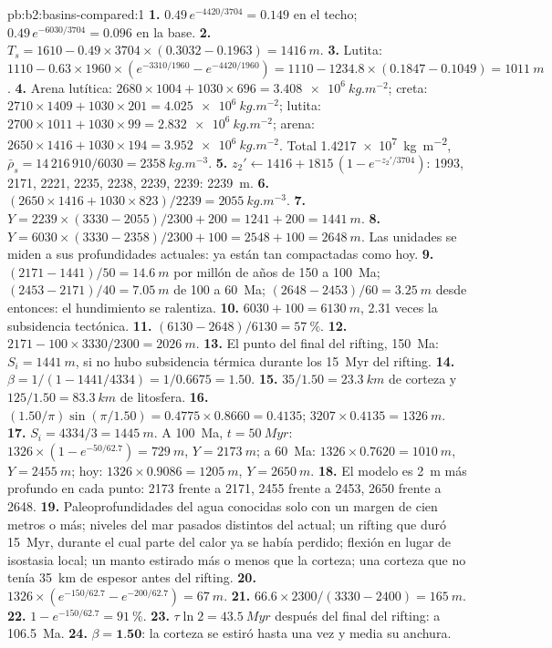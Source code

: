 \begin{solution}{pb:b2:basins-compared:1}
\textbf{1.} $0.49\,e^{-4420/3704} = 0.149$ en el techo; $0.49\,e^{-6030/3704} = 0.096$ en la base.
\textbf{2.} $T_s = 1610 - 0.49\times3704\times(0.3032 - 0.1963) = \qty{1416}{m}$.
\textbf{3.} Lutita: $1110 - 0.63\times1960\times(e^{-3310/1960} - e^{-4420/1960}) = 1110 - 1234.8
\times(0.1847 - 0.1049) = \qty{1011}{m}$.
\textbf{4.} Arena lutítica: $2680\times1004 + 1030\times696 = \qty{3.408e6}{kg.m^{-2}}$; creta:
$2710\times1409 + 1030\times201 = \qty{4.025e6}{kg.m^{-2}}$; lutita: $2700\times1011 + 1030\times99 =
\qty{2.832e6}{kg.m^{-2}}$; arena: $2650\times1416 + 1030\times194 = \qty{3.952e6}{kg.m^{-2}}$. Total
\qty{1.4217e7}{kg.m^{-2}}, $\bar\rho_s = 14\,216\,910/6030 = \qty{2358}{kg.m^{-3}}$.
\textbf{5.} $z_2' \leftarrow 1416 + 1815\,(1 - e^{-z_2'/3704})$: 1993, 2171, 2221, 2235, 2238, 2239,
2239: \qty{2239}{m}.
\textbf{6.} $(2650\times1416 + 1030\times823)/2239 = \qty{2055}{kg.m^{-3}}$.
\textbf{7.} $Y = 2239\times(3330 - 2055)/2300 + 200 = 1241 + 200 = \qty{1441}{m}$.
\textbf{8.} $Y = 6030\times(3330 - 2358)/2300 + 100 = 2548 + 100 = \qty{2648}{m}$. Las unidades se
miden a sus profundidades actuales: ya están tan compactadas como hoy.
\textbf{9.} $(2171 - 1441)/50 = \qty{14.6}{m}$ por millón de años de 150 a \qty{100}{Ma};
$(2453 - 2171)/40 = \qty{7.05}{m}$ de 100 a \qty{60}{Ma}; $(2648 - 2453)/60 = \qty{3.25}{m}$
desde entonces: el hundimiento se ralentiza.
\textbf{10.} $6030 + 100 = \qty{6130}{m}$, 2.31 veces la subsidencia tectónica.
\textbf{11.} $(6130 - 2648)/6130 = \qty{57}{\percent}$.
\textbf{12.} $2171 - 100\times3330/2300 = \qty{2026}{m}$.
\textbf{13.} El punto del final del rifting, \qty{150}{Ma}: $S_i = \qty{1441}{m}$, si no hubo subsidencia
térmica durante los \qty{15}{Myr} del rifting.
\textbf{14.} $\beta = 1/(1 - 1441/4334) = 1/0.6675 = 1.50$.
\textbf{15.} $35/1.50 = \qty{23.3}{km}$ de corteza y $125/1.50 = \qty{83.3}{km}$ de litosfera.
\textbf{16.} $(1.50/\pi)\sin(\pi/1.50) = 0.4775\times0.8660 = 0.4135$; $3207\times0.4135 =
\qty{1326}{m}$.
\textbf{17.} $S_i = 4334/3 = \qty{1445}{m}$. A \qty{100}{Ma}, $t = \qty{50}{Myr}$: $1326\times(1 -
e^{-50/62.7}) = \qty{729}{m}$, $Y = \qty{2173}{m}$; a \qty{60}{Ma}: $1326\times0.7620 =
\qty{1010}{m}$, $Y = \qty{2455}{m}$; hoy: $1326\times0.9086 = \qty{1205}{m}$, $Y = \qty{2650}{m}$.
\textbf{18.} El modelo es \qty{2}{m} más profundo en cada punto: 2173 frente a 2171, 2455 frente a 2453,
2650 frente a 2648.
\textbf{19.} Paleoprofundidades del agua conocidas solo con un margen de cien metros o más; niveles del mar pasados
distintos del actual; un rifting que duró \qty{15}{Myr}, durante el cual parte del calor
ya se había perdido; flexión en lugar de isostasia local; un manto estirado más o menos que la corteza;
una corteza que no tenía \qty{35}{km} de espesor antes del rifting.
\textbf{20.} $1326\times(e^{-150/62.7} - e^{-200/62.7}) = \qty{67}{m}$.
\textbf{21.} $66.6\times2300/(3330 - 2400) = \qty{165}{m}$.
\textbf{22.} $1 - e^{-150/62.7} = \qty{91}{\percent}$.
\textbf{23.} $\tau\ln2 = \qty{43.5}{Myr}$ después del final del rifting: a \qty{106.5}{Ma}.
\textbf{24.} $\beta = \textbf{1.50}$: la corteza se estiró hasta una vez y media su anchura.
\end{solution}
